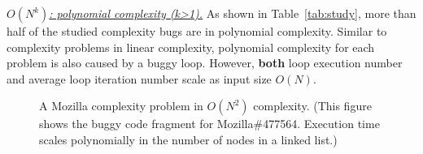 {\underline{\textit{$O(N^k)$: polynomial complexity (k>1).}}}
As shown in Table~\ref{tab:study}, 
more than half of the studied complexity bugs are in polynomial complexity. 
Similar to complexity problems in linear complexity,
polynomial complexity for each problem is also caused by a buggy loop.
However, {\bf both} loop execution number and average loop iteration number
scale as input size $O(N)$.

\begin{figure}
\centering
{}
  \mbox{}
\caption{A Mozilla complexity problem in $O(N^2)$ complexity.
\footnotesize{(This figure shows the buggy code fragment for Mozilla\#477564. 
Execution time scales polynomially in the number of nodes in a linked list.)}}
\vspace{-0.05in}
\label{fig:Mozilla477564}\vspace{-0.05in}
\end{figure}

